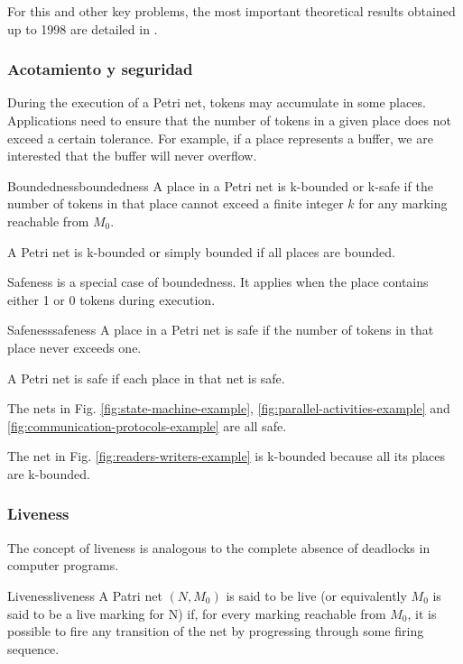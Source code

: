 For this and other key problems, the most important theoretical results
obtained up to 1998 are detailed in \cite{esparza1994decidability}.

\subsubsection{Acotamiento y seguridad}

During the execution of a Petri net, tokens may accumulate in some places.
Applications need to ensure that the number of tokens in a given place does not
exceed a certain tolerance.
For example, if a place represents a buffer,
we are interested that the buffer will never overflow.

\begin{definition}{Boundedness}{boundedness}
      A place in a Petri net is k-bounded or k-safe
      if the number of tokens in that place cannot exceed a finite integer $k$
      for any marking reachable from $M_0$.

      A Petri net is k-bounded or simply bounded if all places are bounded.
\end{definition}

Safeness is a special case of boundedness.
It applies when the place contains either 1 or 0 tokens during execution.

\begin{definition}{Safeness}{safeness}
      A place in a Petri net is safe if the number of tokens in that place never exceeds one.

      A Petri net is safe if each place in that net is safe.
\end{definition}

The nets in Fig. \ref{fig:state-machine-example}, \ref{fig:parallel-activities-example}
and \ref{fig:communication-protocols-example} are all safe.

The net in Fig. \ref{fig:readers-writers-example}
is k-bounded because all its places are k-bounded.

\subsubsection{Liveness}

The concept of liveness is analogous to
the complete absence of deadlocks in computer programs.

\begin{definition}{Liveness}{liveness}
      A Patri net $(N, M_0)$ is said to be live
      (or equivalently $M_0$ is said to be a live marking for N) if,
      for every marking reachable from $M_0$, it is possible to fire any transition
      of the net by progressing through some firing sequence.
\end{definition}

